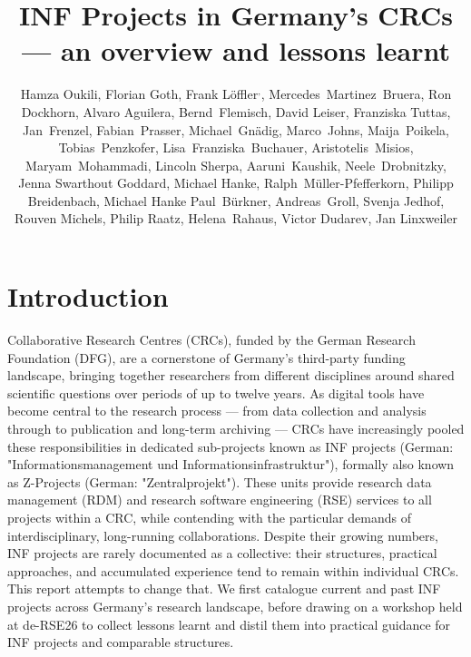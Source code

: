\documentclass{eceasst}
\title{INF Projects in Germany's CRCs --- an overview and lessons learnt}
\author{
Hamza Oukili\authorOrcid{0000-0003-4695-8532}\authorRef{1},
Florian Goth\authorOrcid{0000-0003-2707-4790}\authorRef{2},
Frank Löffler\authorOrcid{0000-0001-6643-6323}\authorRef{3}${}^,$\authorRef{16},
Mercedes~Martinez~Bruera\authorOrcid{0009-0004-2891-7045}\authorRef{4},
Ron Dockhorn\authorOrcid{0000-0002-5268-5430}\authorRef{8},
Alvaro Aguilera\authorOrcid{0000-0001-9324-8555}\authorRef{8},
Bernd~Flemisch\authorOrcid{0000-0001-8188-620X}\authorRef{1},
David Leiser\authorOrcid{0000-0003-0949-8194}\authorRef{14},
Franziska Tuttas\authorOrcid{0000-0003-3898-0908}\authorRef{14},
Jan~Frenzel\authorOrcid{0009-0007-5755-1427}\authorRef{8},
Fabian~Prasser\authorOrcid{0000-0003-3172-3095}\authorRef{5},
Michael~Gnädig\authorRef{5},
Marco~Johns\authorOrcid{0000-0003-4706-6595}\authorRef{5},
Maija~Poikela\authorOrcid{0000-0003-2616-4401}\authorRef{5}, 
Tobias~Penzkofer\authorOrcid{0000-0001-9591-8575}\authorRef{6}, 
Lisa~Franziska~Buchauer\authorOrcid{0000-0002-4722-8390}\authorRef{6},
Aristotelis~Misios\authorRef{6},
Maryam~Mohammadi\authorOrcid{0009-0007-8747-029X}\authorRef{7},
Lincoln Sherpa\authorOrcid{0009-0000-3287-0295}\authorRef{8},
Aaruni~Kaushik\authorOrcid{0009-0006-3061-6553}\authorRef{9},
Neele~Drobnitzky\authorOrcid{0000-0002-3181-941X}\authorRef{10},
Jenna Swarthout Goddard\authorOrcid{0000-0002-0181-0828}\authorRef{11},
Michael Hanke\authorOrcid{0000-0001-6398-6370}\authorRef{11},
Ralph~Müller-Pfefferkorn\authorOrcid{0000-0001-8719-5741}\authorRef{8},
Philipp Breidenbach\authorOrcid{0000-0002-1506-7350}\authorRef{12},
Michael Hanke\authorOrcid{0000-0001-6398-6370}\authorRef{11}
Paul~Bürkner\authorOrcid{0000-0001-5765-8995}\authorRef{13},
Andreas~Groll\authorOrcid{0000-0001-6787-9118}\authorRef{13},
Svenja Jedhof\authorOrcid{0009-0008-2939-9103}\authorRef{13},
Rouven Michels\authorOrcid{0000-0002-5433-6197}\authorRef{13},
Philip Raatz\authorOrcid{0000-0002-9133-0077}\authorRef{12},
Helena~Rahaus\authorOrcid{0009-0009-8843-8528}\authorRef{12},
Victor Dudarev\authorOrcid{0000-0001-7243-9096}\authorRef{15},
Jan Linxweiler\authorOrcid{0000-0002-2755-5087}\authorRef{17}
} %
\institute{%
\autlabel{1} Institute for Modeling Hydraulic and Environmental Systems (IWS), University of Stuttgart,\\
\autlabel{2} Institut für theoretische Physik 1, University of Würzburg, Würzburg,\\
\autlabel{3} Heinz Nixdorf Chair for Distributed Information Systems, Jena,\\
\autlabel{4} Goethe-Universität Frankfurt am Main, Frankfurt am Main,\\
\autlabel{5} Berlin Institute of Health at Charité - Universitätsmedizin Berlin, Berlin,\\
\autlabel{6} Charité - Universitätsmedizin Berlin, Berlin,\\
\autlabel{7} Linguistic Department, University of Bielefeld,\\
\autlabel{8} Center for Interdisciplinary Digital Sciences, Technische Universität Dresden, Dresden,\\
\autlabel{9} Fachbereich Mathematik, Rheinland-Pfälzische Technische Universität Kaiserslautern-Landau, Kaiserslautern,\\
\autlabel{10} Heidelberg University Biochemistry Center (BZH), Heidelberg,\\
\autlabel{11} Forschungszentrum Jülich, Jülich, \\
\autlabel{12} RWI - Leibniz Institute for Economic Research: Essen,\\
\autlabel{13} TU Dortmund University, Dortmund,\\
\autlabel{14} Institute of Space Systems (IRS), University of Stuttgart,\\
\autlabel{15} Materials Discovery and Interfaces (MDI), Ruhr University Bochum,\\
\autlabel{16} de-RSE e.V. --- Society for Research Software in Germany\\
\autlabel{17} Technische Universität Braunschweig, Braunschweig\\
}
\begin{document}
\maketitle

\section{Introduction}

Collaborative Research Centres (CRCs), funded by the German Research Foundation (DFG), are a cornerstone of Germany's third-party funding landscape, bringing together researchers from different disciplines around shared scientific questions over periods of up to twelve years.
As digital tools have become central to the research process — from data collection and analysis through to publication and long-term archiving — CRCs have increasingly pooled these responsibilities in dedicated sub-projects known as INF projects (German: "Informationsmanagement und Informationsinfrastruktur"), formally also known as Z-Projects (German: "Zentralprojekt").
These units provide research data management (RDM) and research software engineering (RSE) services to all projects within a CRC, while contending with the particular demands of interdisciplinary, long-running collaborations.
Despite their growing numbers, INF projects are rarely documented as a collective: their structures, practical approaches, and accumulated experience tend to remain within individual CRCs.
This report attempts to change that.
We first catalogue current and past INF projects across Germany's research landscape, before drawing on a workshop held at de-RSE26 to collect lessons learnt and distil them into practical guidance for INF projects and comparable structures.
\end{document}

